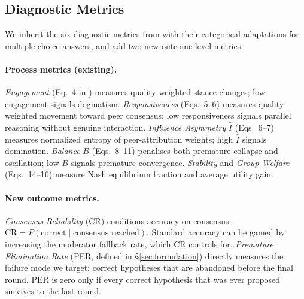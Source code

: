\subsection{Diagnostic Metrics}
\label{sec:metrics}

We inherit the six diagnostic metrics from \citeauthor{diagnostic2026} with
their categorical adaptations for multiple-choice answers, and add two new
outcome-level metrics.

\paragraph{Process metrics (existing).}
\emph{Engagement} (Eq.~4 in \citeauthor{diagnostic2026}) measures
quality-weighted stance changes; low engagement signals dogmatism.
\emph{Responsiveness} (Eqs.~5--6) measures quality-weighted movement toward
peer consensus; low responsiveness signals parallel reasoning without
genuine interaction.
\emph{Influence Asymmetry} $\hat{I}$ (Eqs.~6--7) measures normalized
entropy of peer-attribution weights; high $\hat{I}$ signals domination.
\emph{Balance} $B$ (Eqs.~8--11) penalises both premature collapse and
oscillation; low $B$ signals premature convergence.
\emph{Stability} and \emph{Group Welfare} (Eqs.~14--16) measure Nash
equilibrium fraction and average utility gain.

\paragraph{New outcome metrics.}
\emph{Consensus Reliability} (CR) conditions accuracy on consensus:
$\text{CR}=P(\text{correct}\mid\text{consensus reached})$.
Standard accuracy can be gamed by increasing the moderator fallback rate,
which CR controls for.
\emph{Premature Elimination Rate} (PER, defined in \S\ref{sec:formulation})
directly measures the failure mode we target: correct hypotheses that are
abandoned before the final round.
PER is zero only if every correct hypothesis that was ever proposed survives
to the last round.
